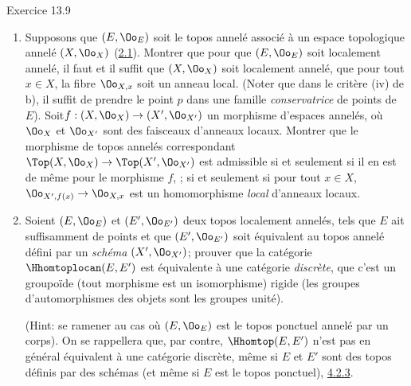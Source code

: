 \begin{enonce*}[remark]{Exercice 13.9}
\begin{enumerate}
\begin{enumerate}
\item Pour tout point $p$ de $E$, posant $p'=f(p)$, l'homomorphisme
naturel sur les fibres
$$
{\Oo}_{E',p'}\longrightarrow {\Oo}_{E,p}
$$
est un homomorphisme \emph{local} d'anneaux locaux.
\end{enumerate}

Lorsque la condition (i) est satisfaite, on dira que $f$ est un
\emph{morphisme de topos localement annelés}, ou encore un
\emph{morphisme admissible de topos localement annelés} si une
confusion est à craindre. On désigne par $\Hhomtoplocan(E,E')$ la
sous-catégorie pleine de la catégorie $\Hhomtopan(E,E')$ de tous les
morphismes de topos annelés de $E$ dans $E'$ définie par les
morphismes admissibles de $E$ dans $E'$.

\item Supposons que $(E,{\Oo}_E)$ soit le topos annelé
  associé à un
espace topologique annelé $(X,{\Oo}_X)$ (\hyperref[IV.subsec2.1]{2.1}).
Montrer que pour que $(E,{\Oo}_E)$ soit localement annelé, il
faut et il suffit que $(X,{\Oo}_X)$ soit localement annelé, \ie
que pour tout $x\in X$, la fibre ${\Oo}_{X,x}$ soit un anneau
local. (Noter que dans le critère (iv) de b), il suffit de prendre
le point $p$ dans une famille \emph{conservatrice} de points de
$E$). Soit\pageoriginale $f:(X,{\Oo}_X)\rightarrow (X',
{\Oo}_{X'})$ un morphisme d'espaces annelés, où ${\Oo}_X$ et
${\Oo}_{X'}$ sont des faisceaux d'anneaux locaux. Montrer que le
morphisme de topos annelés correspondant
$\Top(X,{\Oo}_X)\rightarrow \Top(X', {\Oo}_{X'})$ est
admissible si et seulement si il en est de même pour le morphisme
$f$, \ie; si et seulement si pour tout $x\in X$,
${\Oo}_{X',f(x)}\rightarrow {\Oo}_{X,x}$ est un
homomorphisme \emph{local} d'anneaux locaux.

\item Soient $(E,{\Oo}_E)$ et $(E',{\Oo}_{E'})$ deux topos localement
annelés, tels que $E$ ait suffisamment de points et que
$(E',{\Oo}_{E'})$ soit équivalent au topos annelé défini par un
\emph{schéma} $(X', {\Oo}_{X'})$; prouver que la catégorie
$\Hhomtoplocan(E,E')$ est équivalente à une catégorie
\emph{discrète}, \ie que c'est un groupoïde (tout morphisme est un
isomorphisme) rigide (les groupes d'automorphismes des objets sont
les groupes unité).

\noindent (Hint: se ramener au cas où $(E,{\Oo}_E)$ est le topos
ponctuel annelé par un corps). On se rappellera que, par contre,
$\Hhomtop(E,E')$ n'est pas en général équivalent à une
catégorie
discrète, même si $E$ et $E'$ sont des topos définis par des
schémas
(et même si $E$ est le topos ponctuel), \cf
\hyperref[IV.subsubsec4.2.3]{4.2.3}.


\end{enumerate}
\end{enonce*}
